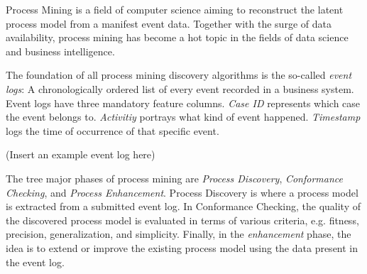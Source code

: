 \begin{comment}
	This
	\item Position the caption of a Figure below the figure.
	\item Position the caption of a Table above the table.
	\item Write Section Headings and Titles Like This\\
	Good: Approximation Bias in Unstable Systems\\
	Bad: Approximation bias in unstable systems\\
	\item Be consistent in your references.
	\begin{itemize}
		\item Make sure that the name of the same author is always the same (using DBLP helps for this)
		\item Titles should be consistent. Either use the style previously described, i.e., Approximation Bias in Unstable Systems or Approximation bias in unstable systems (this is allowed in the references, opposed to your own section headings and titles, however, \emph{BE CONSISTENT}).
	\end{itemize}
\end{enumerate}
\item Next steps: Develop a library to play-out translucent logs from a process model (petri net).
\end{comment}

Process Mining is a field of computer science aiming to reconstruct the latent process model from a manifest event data. Together with the surge of data availability, process mining has become a hot topic in the fields of data science and business intelligence. 

The foundation of all process mining discovery algorithms is the so-called \emph{event logs}: A chronologically ordered list of every event recorded in a business system. Event logs have three mandatory feature columns. \emph{Case ID} represents which case the event belongs to. \emph{Activitiy} portrays what kind of event happened. \emph{Timestamp} logs the time of occurrence of that specific event. 

(Insert an example event log here)

The tree major phases of process mining are \emph{Process Discovery}, \emph{Conformance Checking}, and \emph{Process Enhancement}. Process Discovery is where a process model is extracted from a submitted event log. In Conformance Checking, the quality of the discovered process model is evaluated in terms of various criteria, e.g. fitness, precision, generalization, and simplicity. Finally, in the \emph{enhancement} phase, the idea is to extend or improve the existing process model using the data present in the event log.











